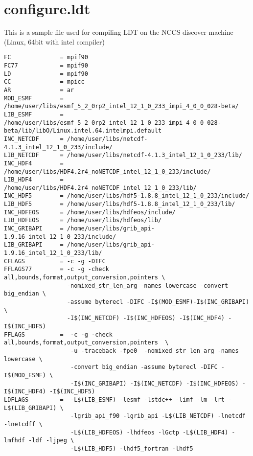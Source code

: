 
\section{configure.ldt} \label{sec:configure.ldt}
This is a sample  file used for compiling LDT on the NCCS
discover machine (Linux, 64bit with intel compiler)

\begin{verbatim}
FC              = mpif90
FC77            = mpif90
LD              = mpif90
CC              = mpicc
AR              = ar
MOD_ESMF        = /home/user/libs/esmf_5_2_0rp2_intel_12_1_0_233_impi_4_0_0_028-beta/
LIB_ESMF        = /home/user/libs/esmf_5_2_0rp2_intel_12_1_0_233_impi_4_0_0_028-beta/lib/libO/Linux.intel.64.intelmpi.default
INC_NETCDF      = /home/user/libs/netcdf-4.1.3_intel_12_1_0_233/include/
LIB_NETCDF      = /home/user/libs/netcdf-4.1.3_intel_12_1_0_233/lib/
INC_HDF4        = /home/user/libs/HDF4.2r4_noNETCDF_intel_12_1_0_233/include/
LIB_HDF4        = /home/user/libs/HDF4.2r4_noNETCDF_intel_12_1_0_233/lib/
INC_HDF5        = /home/user/libs/hdf5-1.8.8_intel_12_1_0_233/include/
LIB_HDF5        = /home/user/libs/hdf5-1.8.8_intel_12_1_0_233/lib/
INC_HDFEOS      = /home/user/libs/hdfeos/include/
LIB_HDFEOS      = /home/user/libs/hdfeos/lib/
INC_GRIBAPI     = /home/user/libs/grib_api-1.9.16_intel_12_1_0_233/include/
LIB_GRIBAPI     = /home/user/libs/grib_api-1.9.16_intel_12_1_0_233/lib/
CFLAGS          = -c -g -DIFC
FFLAGS77        = -c -g -check all,bounds,format,output_conversion,pointers \
                  -nomixed_str_len_arg -names lowercase -convert big_endian \
                  -assume byterecl -DIFC -I$(MOD_ESMF)-I$(INC_GRIBAPI) \
                  -I$(INC_NETCDF) -I$(INC_HDFEOS) -I$(INC_HDF4) -I$(INC_HDF5)
FFLAGS          =  -c -g -check all,bounds,format,output_conversion,pointers  \
                   -u -traceback -fpe0  -nomixed_str_len_arg -names lowercase \
                   -convert big_endian -assume byterecl -DIFC -I$(MOD_ESMF) \
                   -I$(INC_GRIBAPI) -I$(INC_NETCDF) -I$(INC_HDFEOS) -I$(INC_HDF4) -I$(INC_HDF5)
LDFLAGS         =  -L$(LIB_ESMF) -lesmf -lstdc++ -limf -lm -lrt -L$(LIB_GRIBAPI) \
                   -lgrib_api_f90 -lgrib_api -L$(LIB_NETCDF) -lnetcdf -lnetcdff \
                   -L$(LIB_HDFEOS) -lhdfeos -lGctp -L$(LIB_HDF4) -lmfhdf -ldf -ljpeg \
                   -L$(LIB_HDF5) -lhdf5_fortran -lhdf5
\end{verbatim}
